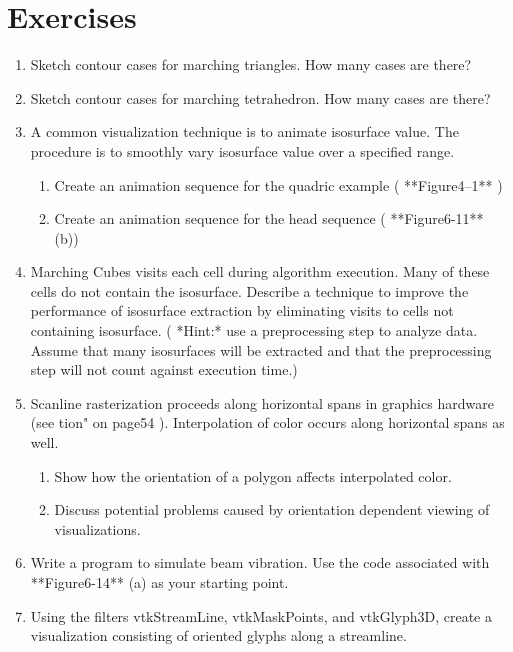\section{Exercises}
\begin{enumerate}

\item Sketch contour cases for marching triangles. How many cases are there?

\item Sketch contour cases for marching tetrahedron. How many cases are there?

\item A common visualization technique is to animate isosurface value. The procedure is to smoothly vary isosurface value over a specified range.	
\begin{enumerate}
	\item Create an animation sequence for the quadric example ( **Figure4--1** )
	\item Create an animation sequence for the head sequence ( **Figure6-11** (b))
\end{enumerate}

\item Marching Cubes visits each cell during algorithm execution. Many of these cells do not contain the isosurface. Describe a technique to improve the performance of isosurface extraction by eliminating visits to cells not containing isosurface. ( *Hint:* use a preprocessing step to analyze data. Assume that many isosurfaces will be extracted and that the preprocessing step will not count against execution time.)

\item Scanline rasterization proceeds along horizontal spans in graphics hardware (see tion" on page54 ). Interpolation of color occurs along horizontal spans as well.
\begin{enumerate}
	\item Show how the orientation of a polygon affects interpolated color.
	\item Discuss potential problems caused by orientation dependent viewing of visualizations.
\end{enumerate}

\item Write a program to simulate beam vibration. Use the code associated with **Figure6-14** (a) as your starting point.

\item 	 Using the filters vtkStreamLine, vtkMaskPoints, and vtkGlyph3D, create a visualization consisting of oriented glyphs along a streamline.


\end{enumerate}
